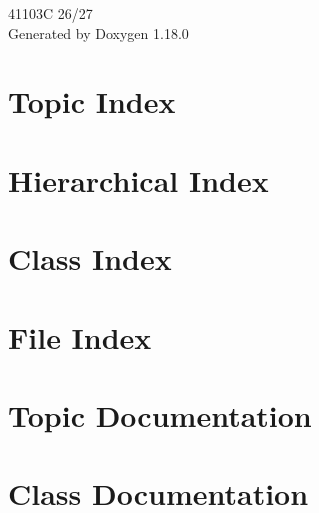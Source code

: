 \documentclass[twoside]{book}
\newcommand{\+}{\discretionary{\mbox{\scriptsize$\hookleftarrow$}}{}{}}
\newcommand{\clearemptydoublepage}{%
    \newpage{\pagestyle{empty}\cleardoublepage}%
  }
\begin{document}
  \raggedbottom
    \hypersetup{pageanchor=false,
                bookmarksnumbered=true,
                pdfencoding=unicode
               }
  \begin{titlepage}
  \vspace*{7cm}
  \begin{center}%
  {\Large 41103\+C 26/\+27}\\
  \vspace*{1cm}
  {\large Generated by Doxygen 1.18.0}\\
  \end{center}
  \end{titlepage}
  \clearemptydoublepage
  \tableofcontents
  \clearemptydoublepage
  \hypersetup{pageanchor=true}


\chapter{Topic Index}

\chapter{Hierarchical Index}

\chapter{Class Index}

\chapter{File Index}

\chapter{Topic Documentation}

\chapter{Class Documentation}














\end{document}
